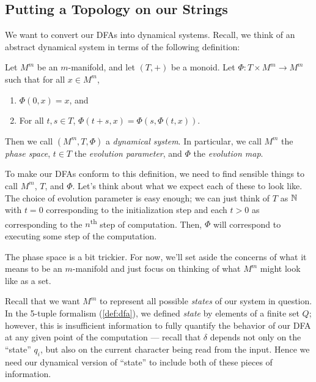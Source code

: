 \documentclass{fkpaper}
\begin{document}
\begin{multicols}{2}
\subsection{Putting a Topology on our Strings}
We want to convert our DFAs into dynamical systems. Recall, we think
of an abstract dynamical system in terms of the following definition:
\begin{definition}
  Let $M^m$ be an $m$-manifold, and let $(T, +)$ be a monoid. Let
  $\Phi : T \times M^m \to M^m$ such that for all $x \in M^m$,
  \begin{enumerate}
    \item $\Phi(0, x) = x$, and
    \item For all $t,s \in T$, $\Phi(t + s, x) = \Phi(s, \Phi(t, x))$.
  \end{enumerate}
  Then we call $(M^m, T, \Phi)$ a \emph{dynamical system}. In
  particular, we call $M^m$ the \emph{phase space}, $t \in T$ the
  \emph{evolution parameter}, and $\Phi$ the \emph{evolution map}.
\end{definition}
To make our DFAs conform to this definition, we need to find sensible
things to call $M^m$, $T$, and $\Phi$. Let's think about what we
expect each of these to look like. The choice of evolution parameter
is easy enough; we can just think of $T$ as $\mathbb{N}$ with $t=0$
corresponding to the initialization step and each $t > 0$ as
corresponding to the $n$\textsuperscript{th} step of computation.
Then, $\Phi$ will correspond to executing some step of the
computation.

The phase space is a bit trickier. For now, we'll set aside the
concerns of what it means to be an $m$-manifold and just focus on
thinking of what $M^m$ might look like as a set.

Recall that we want $M^m$ to represent all possible \emph{states} of
our system in question. In the 5-tuple formalism (\cref{def:dfa}), we
defined \emph{state} by elements of a finite set $Q$; however, this is
insufficient information to fully quantify the behavior of our DFA at
any given point of the computation --- recall that $\delta$ depends
not only on the ``state'' $q_i$, but also on the current character
being read from the input. Hence we need our dynamical version of
``state'' to include both of these pieces of information.


\end{multicols}
\end{document}
